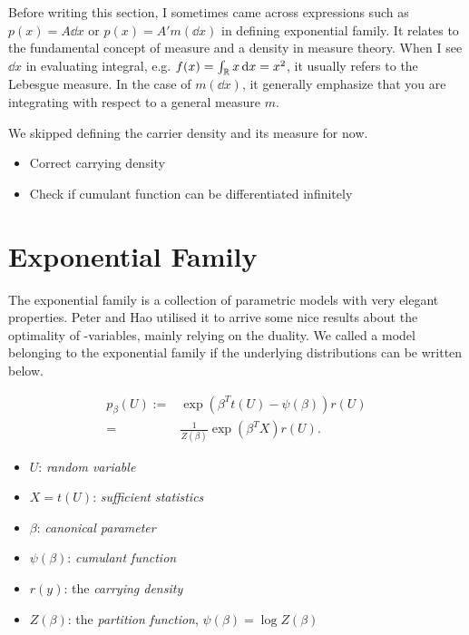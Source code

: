 \clearpage

Before writing this section, I sometimes came across expressions such as
$p(x) = A \dd{x}$ or $p(x) = A' m(\dd{x})$ in defining exponential family.
It relates to the fundamental concept of measure and a density in measure theory.
When I see $\dd{x}$ in evaluating integral, e.g. $f(x) = \int_{\mathbb{R}} x \dd{x} = x^2$,
it usually refers to the Lebesgue measure.
In the case of $m(\dd{x})$, it generally emphasize that you are integrating
with respect to a general measure $m$.

We skipped defining the carrier density and its measure for now.


\begin{itemize}
	\item Correct carrying density
	\item Check if cumulant function can be differentiated infinitely
\end{itemize}

\section{Exponential Family}

The exponential family is a collection of parametric models with very elegant properties.
Peter and Hao utilised it to arrive some nice results about
the optimality of \E-variables, mainly relying on the duality.
We called a model belonging to the exponential family
if the underlying distributions can be written below.


\begin{define}
	\begin{align}\label{eq:exp=family}
		p_\beta(U)
		:= & \exp\left(\beta^T t(U) - \psi(\beta)\right) r(U) \\
		=  & \frac{1}{Z(\beta)} \exp(\beta^T X) r(U).
	\end{align}
\end{define}

\begin{itemize}
	\item $U$: \emph{random variable}
	\item $X=t(U)$: \emph{sufficient statistics}
	\item $\beta$: \emph{canonical parameter}
	\item $\psi(\beta)$: \emph{cumulant function}
	\item $r(y)$: the \emph{carrying density}
	\item $Z(\beta)$: the \emph{partition function}, $\psi(\beta)=\log Z(\beta)$
\end{itemize}

